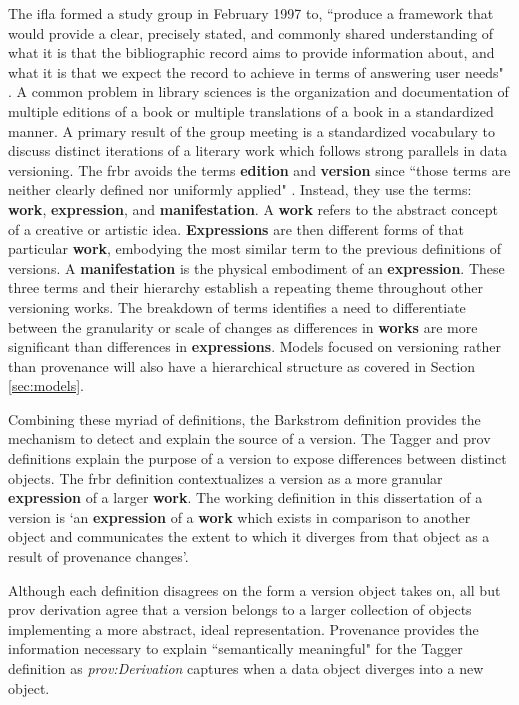 The \gls{ifla} formed a study group in February 1997 to, ``produce a framework that would provide a clear, precisely stated, and commonly shared understanding of what it is that the bibliographic record aims to provide information about, and what it is that we expect the record to achieve in
terms of answering user needs" \cite{frbr}.
A common problem in library sciences is the organization and documentation of multiple editions of a book or multiple translations of a book in a standardized manner.
A primary result of the group meeting is a standardized vocabulary to discuss distinct iterations of a literary work which follows strong parallels in data versioning.
The \gls{frbr} avoids the terms \textbf{edition} and \textbf{version} since ``those terms are neither clearly defined nor uniformly applied" \cite{frbr}.
Instead, they use the terms: \textbf{work}, \textbf{expression}, and \textbf{manifestation}.
A \textbf{work} refers to the abstract concept of a creative or artistic idea.
\textbf{Expressions} are then different forms of that particular \textbf{work}, embodying the most similar term to the previous definitions of versions.
A \textbf{manifestation} is the physical embodiment of an \textbf{expression}.
These three terms and their hierarchy establish a repeating theme throughout other versioning works.
The breakdown of terms identifies a need to differentiate between the granularity or scale of changes as differences in \textbf{works} are more significant than differences in \textbf{expressions}.
Models focused on versioning rather than provenance will also have a hierarchical structure as covered in Section \ref{sec:models}.

Combining these myriad of definitions, the Barkstrom definition provides the mechanism to detect and explain the source of a version.
The Tagger and \gls{prov} definitions explain the purpose of a version to expose differences between distinct objects.
The \gls{frbr} definition contextualizes a version as a more granular \textbf{expression} of a larger \textbf{work}.
The working definition in this dissertation of a \gls{version} is `an \textbf{expression} of a \textbf{work} which exists in comparison to another object and communicates the extent to which it diverges from that object as a result of provenance changes'.

Although each definition disagrees on the form a version object takes on, all but \gls{prov} derivation agree that a version belongs to a larger collection of objects implementing a more abstract, ideal representation.
Provenance provides the information necessary to explain ``semantically meaningful" for the Tagger definition as \textit{prov:Derivation} captures when a data object diverges into a new object.

